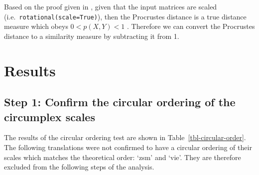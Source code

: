 \documentclass[
  authoryear,
  preprint,
  3p]{elsarticle}
\begin{document}
Based on the proof given in \citet{Baktiar2015symmetrical}, given that
the input matrices are scaled (i.e.~\texttt{rotational(scale=True)}),
then the Procrustes distance is a true distance measure which obeys
\(0 < p(X, Y) < 1\) \citep[322]{Bakhtiar2015symmetrical}. Therefore we
can convert the Procrustes distance to a similarity measure by
subtracting it from 1.

\section{Results}\label{results}

\subsection{Step 1: Confirm the circular ordering of the circumplex
scales}\label{step-1-confirm-the-circular-ordering-of-the-circumplex-scales-1}

The results of the circular ordering test are shown in
Table~\ref{tbl-circular-order}. The following translations were not
confirmed to have a circular ordering of their scales which matches the
theoretical order: `zsm' and `vie'. They are therefore excluded from the
following steps of the analysis.
\end{document}

